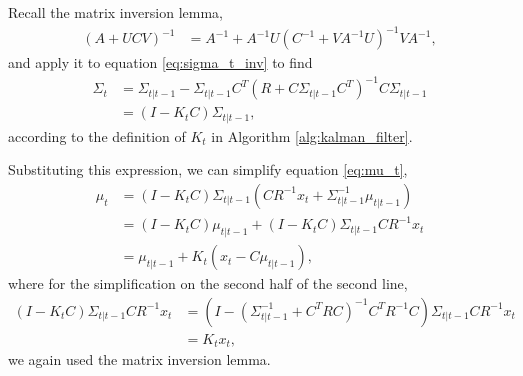 \documentclass[14pt]{extarticle}
\begin{document}
Recall the matrix inversion lemma,
\begin{align*}
\left(A + UCV\right)^{-1} &= A^{-1} + A^{-1}U\left(C^{-1} + VA^{-1}U\right)^{-1}VA^{-1},
\end{align*}
and apply it to equation \ref{eq:sigma_t_inv} to find
\begin{align*}
  \Sigma_{t} &= \Sigma_{t \vert t - 1} - \Sigma_{t \vert t - 1}C^T\left(R + C \Sigma_{t \vert t - 1}C^{T}\right)^{-1}C\Sigma_{t \vert t - 1} \\
  &= \left(I - K_{t}C\right)\Sigma_{t \vert t - 1},
\end{align*}
according to the definition of $K_{t}$ in Algorithm
\ref{alg:kalman_filter}.

Substituting this expression, we can simplify equation \ref{eq:mu_t},
\begin{align*}
  \mu_{t} &= \left(I - K_{t} C\right)\Sigma_{t \vert t - 1}\left(C R^{-1}x_{t} + \Sigma_{t \vert t - 1}^{-1} \mu_{t \vert t - 1}\right) \\
  &= \left(I - K_{t}C\right)\mu_{t \vert t - 1} + \left(I - K_{t} C\right)\Sigma_{t \vert t - 1}C R^{-1} x_{t} \\
  &= \mu_{t \vert t - 1} + K_{t}\left(x_{t} - C\mu_{t \vert t- 1}\right),
\end{align*}
where for the simplification on the second half of the second line,
\begin{align*}
  \left(I - K_{t}C\right)\Sigma_{t \vert t - 1} C R^{-1} x_{t} &= \left(I - \left(\Sigma_{t \vert t - 1}^{-1} + C^{T} R C\right)^{-1}C^{T}R^{-1}C\right)\Sigma_{t \vert t - 1}C R^{-1} x_{t} \\
  &= K_{t}x_{t},
\end{align*}
we again used the matrix inversion lemma.
\end{document}
